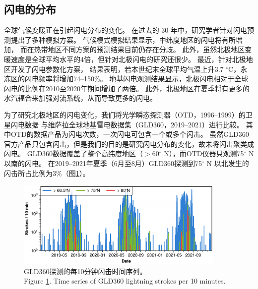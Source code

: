 \subsection{闪电的分布} \label{subsect:lightning_distribution}

全球气候变暖正在引起闪电分布的变化\citep{Reeve.1999,Williams.2005a,Price.2009a}。
在过去的 30 年中，研究学者针对闪电预测提出了多种模拟方案\citep{Price.1992,Price.1997b,Allen.2002,Futyan.2007,Finney.2014,Romps.2014}。
气候模式模拟结果显示，中纬度地区的闪电将有所增加\citep{Michalon.1999,Romps.2014,Luhar.2021}，
而在热带地区不同方案的预测结果目前仍存在分歧\citep{Finney.2018,Romps.2019}。
此外，虽然北极地区变暖速度是全球平均水平的4倍\citep{Rantanen.2022}，但针对北极闪电的研究还很少。
最近，\citet{Chen.2021a}针对北极地区开发了闪电参数化方案，
结果表明，若本世纪末全球平均气温上升3.7 $^{\circ}$C，永冻区的闪电频率将增加74--150\%。
地基闪电观测结果显示，北极闪电相对于全球闪电的比例在2010至2020年期间增加了两倍\citep{Holzworth.2021}。
此外，北极地区在夏季将有更多的水汽辐合来加强对流系统，从而导致更多的闪电\citep{Bintanja.2020}。

为了研究北极地区的闪电变化，我们将光学瞬态探测器（OTD，1996--1999）的卫星闪电数据
与维萨拉全球地基雷电数据集（GLD360，2019--2021）进行比较。
其中OTD的数据产品为闪电次数，一次闪电可包含一个或多个闪击。
虽然GLD360官方产品只包含闪击，但是我们的目的是研究闪电分布的变化，故未将闪击聚类成闪电。
GLD360数据覆盖了整个高纬度地区（$>$60$^{\circ}$ N），而OTD仪器只观测75$^{\circ}$ N以南的闪电。
在2019--2021年夏季（6月至8月）GLD360探测到75$^{\circ}$ N 以北发生的闪击所占比例为3\%（图\ref{fig:gld360_tseries}）。

\begin{figure}[H]
\centering
\includegraphics[width=0.9\textwidth]{./figures/arctic_gld360_tseries.png}
\caption{
GLD360探测的每10分钟闪击时间序列。\\
Figure \ref{fig:gld360_tseries}. Time series of GLD360 lightning strokes per 10 minutes.
}
\label{fig:gld360_tseries}
\end{figure}


